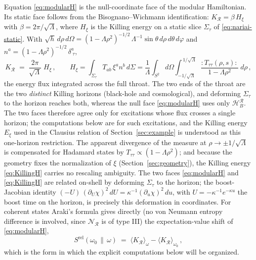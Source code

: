 \documentclass[11pt]{article}
\newcommand{\Srel}{S^{\mathrm{rel}}}
\begin{document}
Equation \eqref{eq:modularH} is the null-coordinate face of the modular Hamiltonian. Its static face follows from the Bisognano--Wichmann identification: $K_{\mathcal{R}} = \beta\, H_\xi$ with $\beta = 2\pi/\sqrt{\Lambda}$, where $H_\xi$ is the Killing energy on a static slice $\Sigma_\tau$ of \eqref{eq:nariai-static}. With $\sqrt{h}\, d\rho\, d\Omega = (1-\Lambda\rho^2)^{-1/2}\, \Lambda^{-1} \sin\theta\, d\rho\, d\theta\, d\varphi$ and $n^a = (1-\Lambda\rho^2)^{-1/2}\, \delta^a_{\;\tau}$,
\begin{equation}
K_{\mathcal{R}} \;=\; \frac{2\pi}{\sqrt{\Lambda}}\; H_\xi\,,
\qquad
H_\xi
= \int_{\Sigma_\tau} T_{ab}\, \xi^a n^b\, d\Sigma
= \frac{1}{\Lambda} \int_{S^2} d\Omega \int_{-1/\sqrt{\Lambda}}^{\,1/\sqrt{\Lambda}}
\frac{{:}T_{\tau\tau}(\rho, s){:}}{1 - \Lambda \rho^2}\; d\rho\,,
\label{eq:KillingH}
\end{equation}
the energy flux integrated across the full throat. The two ends of the throat are the two \emph{distinct} Killing horizons (black-hole and cosmological), and deforming $\Sigma_\tau$ to the horizon reaches both, whereas the null face \eqref{eq:modularH} uses only $\mathcal H_B^{\mathcal R}$. The two faces therefore agree only for excitations whose flux crosses a single horizon; the computations below are for such excitations, and the Killing energy $E_\xi$ used in the Clausius relation of Section~\ref{sec:example} is understood as this one-horizon restriction. The apparent divergence of the measure at $\rho \to \pm 1/\sqrt{\Lambda}$ is compensated for Hadamard states by $T_{\tau\tau} \propto (1-\Lambda\rho^2)$; and because the geometry fixes the normalization of $\xi$ (Section~\ref{sec:geometry}), the Killing energy \eqref{eq:KillingH} carries no rescaling ambiguity. The two faces \eqref{eq:modularH} and \eqref{eq:KillingH} are related on-shell by deforming $\Sigma_\tau$ to the horizon; the boost-Jacobian identity $(-U)\,(\partial_U\chi)^2\,dU = \kappa^{-1}(\partial_u\chi)^2\,du$, with $U = -\kappa^{-1}e^{-\kappa u}$ the boost time on the horizon, is precisely this deformation in coordinates. For coherent states Araki's formula gives directly (no von Neumann entropy difference is involved, since $\mathscr N_{\mathcal R}$ is of type III) the expectation-value shift of \eqref{eq:modularH},
\begin{equation}
\Srel(\omega_0\,\|\,\omega) \;=\; \langle K_{\mathcal{R}} \rangle_{\omega} - \langle K_{\mathcal{R}} \rangle_{\omega_0}\,,
\label{eq:Srel-K}
\end{equation}
which is the form in which the explicit computations below will be organized.
\end{document}
